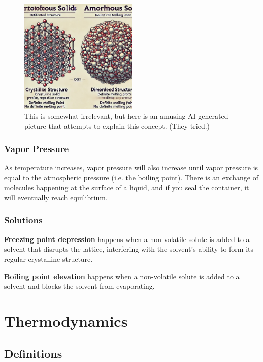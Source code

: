 \documentclass[a4paper, 12pt]{article}
\begin{document}
\begin{figure}[H]
\centering
\includegraphics[width=0.5\textwidth]{funnypic.jpg}
\caption*{This is somewhat irrelevant, but here is an amusing AI-generated picture that attempts to explain this concept. (They tried.)}
\end{figure}

\subsubsection{Vapor Pressure}
As temperature increases, vapor pressure will also increase until vapor pressure is equal to the atmospheric pressure (i.e. the boiling point). There is an exchange of molecules happening at the surface of a liquid, and if you seal the container, it will eventually reach equilibrium.

\subsubsection{Solutions}
\textbf{Freezing point depression} happens when a non-volatile solute is added to a solvent that disrupts the lattice, interfering with the solvent's ability to form its regular crystalline structure.

\textbf{Boiling point elevation} happens when a non-volatile solute is added to a solvent and blocks the solvent from evaporating.

\section{Thermodynamics}
\subsection{Definitions}
\end{document}
